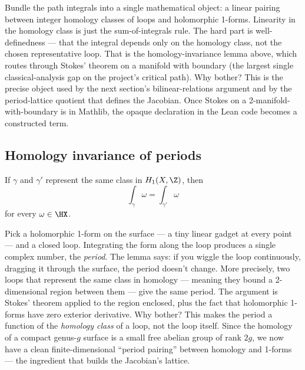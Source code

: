 \begin{layman}
Bundle the path integrals into a single mathematical object: a
linear pairing between integer homology classes of loops and
holomorphic 1-forms. Linearity in the homology class is just the
sum-of-integrals rule. The hard part is well-definedness — that
the integral depends only on the homology class, not the chosen
representative loop. That is the homology-invariance lemma above,
which routes through Stokes' theorem on a manifold with boundary
(the largest single classical-analysis gap on the project's
critical path). Why bother? This is the precise object used by
the next section's bilinear-relations argument and by the
period-lattice quotient that defines the Jacobian. Once Stokes
on a 2-manifold-with-boundary is in Mathlib, the opaque
declaration in the Lean code becomes a constructed term.
\end{layman}

\subsection{Homology invariance of periods}

\begin{lemma}
\label{lem:period-homology-invariance}
\notready
If \(\gamma\) and \(\gamma'\) represent the same class in \(H_1(X,\Z)\), then
\[
  \int_{\gamma}\omega=\int_{\gamma'}\omega
\]
for every \(\omega\in\HX\).
\end{lemma}

\begin{layman}
Pick a holomorphic 1-form on the surface — a tiny linear gadget at every
point — and a closed loop. Integrating the form along the loop produces a
single complex number, the \emph{period}. The lemma says: if you wiggle
the loop continuously, dragging it through the surface, the period
doesn't change. More precisely, two loops that represent the same class
in homology — meaning they bound a 2-dimensional region between them —
give the same period. The argument is Stokes' theorem applied to the
region enclosed, plus the fact that holomorphic 1-forms have zero
exterior derivative. Why bother? This makes the period a function of the
\emph{homology class} of a loop, not the loop itself. Since the homology
of a compact genus-\(g\) surface is a small free abelian group of rank
\(2g\), we now have a clean finite-dimensional ``period pairing''
between homology and 1-forms — the ingredient that builds the Jacobian's
lattice.
\end{layman}

